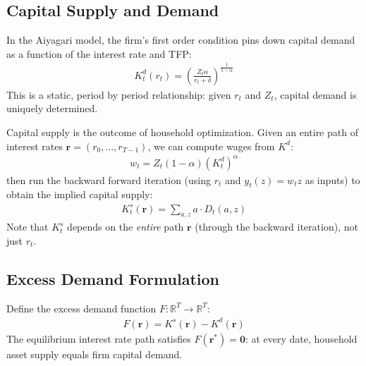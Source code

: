 \documentclass[12pt]{article}
\newcommand{\R}{\mathbb{R}}
\begin{document}
\subsection{Capital Supply and Demand}

In the Aiyagari model, the firm's first order condition pins down capital demand as a function of the interest rate and TFP:
\begin{align}
    K^d_t(r_t) = \left(\frac{Z_t \alpha}{r_t + \delta}\right)^{\frac{1}{1 - \alpha}} \label{eq:K_demand}
\end{align}
This is a static, period by period relationship: given $r_t$ and $Z_t$, capital demand is uniquely determined.

Capital supply is the outcome of household optimization. Given an entire path of interest rates $\mathbf{r} = (r_0, \ldots, r_{T-1})$, we can compute wages from $K^d$:
\begin{align}
    w_t = Z_t (1 - \alpha) \left(K^d_t\right)^{\alpha} \label{eq:wage_from_r}
\end{align}
then run the backward forward iteration (using $r_t$ and $y_t(z) = w_t z$ as inputs) to obtain the implied capital supply:
\begin{align}
    K^s_t(\mathbf{r}) = \sum_{a, z} a \cdot D_t(a, z) \label{eq:K_supply}
\end{align}
Note that $K^s_t$ depends on the \emph{entire} path $\mathbf{r}$ (through the backward iteration), not just $r_t$.

\subsection{Excess Demand Formulation}

Define the excess demand function $F: \R^T \to \R^T$:
\begin{align}
    F(\mathbf{r}) = K^s(\mathbf{r}) - K^d(\mathbf{r}) \label{eq:residual_r}
\end{align}
The equilibrium interest rate path satisfies $F(\mathbf{r}^*) = \mathbf{0}$: at every date, household asset supply equals firm capital demand.
\end{document}
